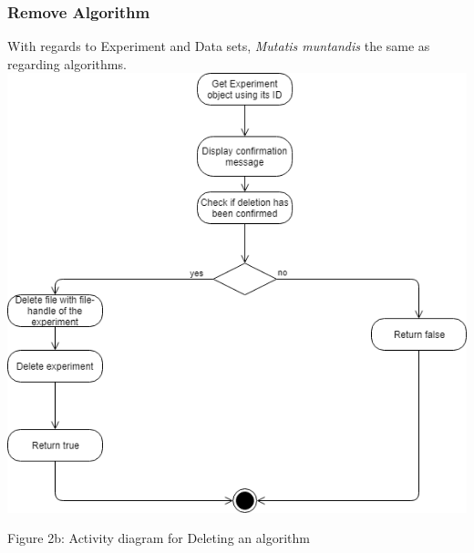     \subsubsection{Remove Algorithm}
    \par With regards to Experiment and Data sets,
{ \textit{Mutatis muntandis} the same as regarding algorithms.} \newline \newline
    \includegraphics[width=\textwidth]{input_unit/images/delete_activity_diagram.png}
	\begin{center}
	    \small{Figure 2b: Activity diagram for Deleting an algorithm }
    \end{center}
    
